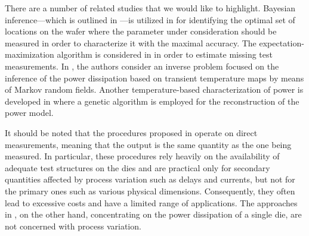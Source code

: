 There are a number of related studies that we would like to highlight. Bayesian
inference---which is outlined in ---is utilized in
\cite{zhang2010} for identifying the optimal set of locations on the wafer where
the parameter under consideration should be measured in order to characterize it
with the maximal accuracy. The expectation-maximization algorithm is considered
in \cite{reda2009} in order to estimate missing test measurements. In
\cite{paek2012}, the authors consider an inverse problem focused on the
inference of the power dissipation based on transient temperature maps by means
of Markov random fields. Another temperature-based characterization of power is
developed in \cite{mesa-martinez2007} where a genetic algorithm is employed for
the reconstruction of the power model.

It should be noted that the procedures proposed in \cite{reda2009, zhang2010}
operate on direct measurements, meaning that the output is the same quantity as
the one being measured. In particular, these procedures rely heavily on the
availability of adequate test structures on the dies and are practical only for
secondary quantities affected by process variation such as delays and currents,
but not for the primary ones such as various physical dimensions. Consequently,
they often lead to excessive costs and have a limited range of applications. The
approaches in \cite{mesa-martinez2007, paek2012}, on the other hand,
concentrating on the power dissipation of a single die, are not concerned with
process variation.
